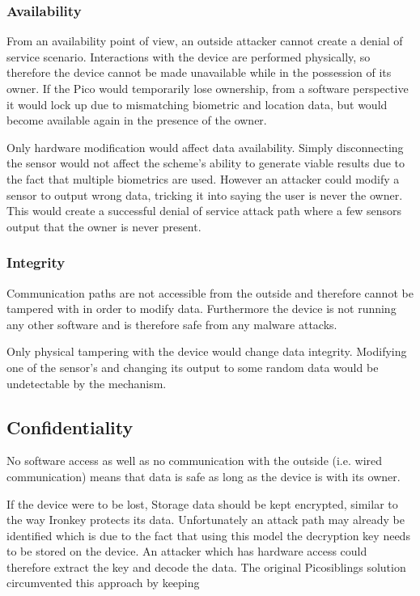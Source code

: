 	\subsubsection*{Availability}
	From an availability point of view, an outside attacker cannot create a denial of service scenario. Interactions with the device are performed physically, so therefore the device cannot be made unavailable while in the possession of its owner. If the Pico would temporarily lose ownership, from a software perspective it would lock up due to mismatching biometric and location data, but would become available again in the presence of the owner. 
	
	Only hardware modification would affect data availability. Simply disconnecting the sensor would not affect the scheme's ability to generate viable results due to the fact that multiple biometrics are used. However an attacker could modify a sensor to output wrong data, tricking it into saying the user is never the owner. This would create a successful denial of service attack path where a few sensors output that the owner is never present. 
	
	\subsubsection*{Integrity}
	Communication paths are not accessible from the outside and therefore cannot be tampered with in order to modify data. Furthermore the device is not running any other software and is therefore safe from any malware attacks. 
	
	Only physical tampering with the device would change data integrity. Modifying one of the sensor's and changing its output to some random data would be undetectable by the mechanism. 
	
	\subsection*{Confidentiality}
	No software access as well as no communication with the outside (i.e. wired communication) means that data is safe as long as the device is with its owner.
	
	If the device were to be lost, 
	Storage data should be kept encrypted, similar to the way Ironkey \cite{} protects its data. Unfortunately an attack path may already be identified which is due to the fact that using this model the decryption key needs to be stored on the device. An attacker which has hardware access could therefore extract the key and decode the data. The original Picosiblings solution circumvented this approach by keeping 

